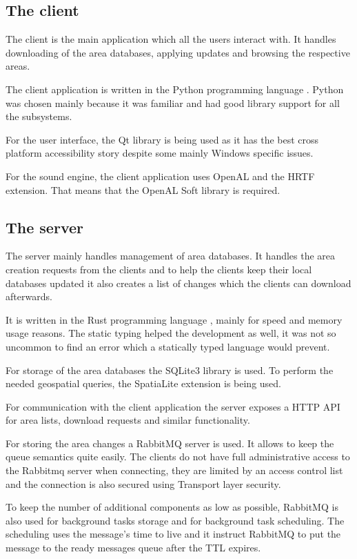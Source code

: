 \documentclass[nolof,digital]{fithesis3}
\begin{document}
\subsection{The client}
The client is the main application which all the users interact with. It handles downloading of the area databases, applying updates and browsing the respective areas.

The client application is written in the Python programming language \parencite{python}. Python was chosen mainly because it was familiar and had good library support for all the subsystems.

For the user interface, the Qt library \parencite{qt} is being used as it has the best cross platform accessibility story despite some mainly Windows specific issues.

For the sound engine, the client application uses OpenAL and the HRTF extension. That means that the OpenAL Soft library \parencite{openalsoft} is required.
\subsection{The server}
The server mainly handles management of area databases. It handles the area creation requests from the clients and to help the clients keep their local databases updated it also creates a list of changes which the clients can download afterwards.

It is written in the Rust programming language \parencite{rust}, mainly for speed and memory usage reasons. The static typing helped the development as well, it was not so uncommon to find an error which a statically typed language would prevent.

For storage of the area databases the SQLite3 library \parencite{sqlite} is used. To perform the needed geospatial queries, the SpatiaLite extension \parencite{spatialite} is being used.

For communication with the client application the server exposes a HTTP API for area lists, download requests and similar functionality. 

For storing the area changes a RabbitMQ \parencite{rabbitmq} server is used. It allows to keep the queue semantics quite easily. The clients do not have full administrative access to the Rabbitmq server when connecting, they are limited by an access control list and the connection is also secured using Transport layer security.

To keep the number of additional components as low as possible, RabbitMQ is also used for background tasks storage and for background task scheduling. The scheduling uses the message's time to live and it instruct RabbitMQ to put the message to the ready messages queue after the TTL expires.
\end{document}
